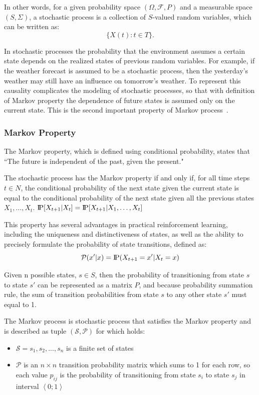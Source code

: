\documentclass[../xlapes02]{subfiles}
\begin{document}
    In other words, for a given probability space $(\Omega, \mathcal{F}, P)$ and a measurable space $(S, \Sigma)$, a stochastic process is a collection of $S$-valued random variables, which can be written as:~\cite{enwiki:1148510872}
    \[
        \{X(t) : t \in T\}.
    \]

    In stochastic processes the probability that the environment assumes a certain state depends on the realized states of previous random variables. For example, if the weather forecast is assumed to be a stochastic process, then the yesterday’s weather may still have an influence on tomorrow’s weather. To represent this causality complicates the modeling of stochastic processes, so that with definition of Markov property the dependence of future states is assumed only on the current state. This is the second important property of Markov process~\cite{FITMT25127}.

    \subsubsection{Markov Property}\label{subsubsec:markov-property}
    The Markov property, which is defined using conditional probability, states that ``The future is independent of the past, given the present."

    The stochastic process has the Markov property if and only if, for all time steps $t \in N$, the conditional probability of the next state given the current state is equal to the conditional probability of the next state given all the previous states $X_1, \ldots, X_t$. $\text{I\kern-0.15em P}[X_{t+1}|X_t] = \text{I\kern-0.15em P}[X_{t+1}|X_1,\ldots,X_t]$

    This property has several advantages in practical reinforcement learning, including the uniqueness and distinctiveness of states, as well as the ability to precisely formulate the probability of state transitions, defined as:~\cite{FITMT25127}
    \begin{equation}
        \mathcal{P}(x'|x)=\text{I\kern-0.15em P}(X_{t+1}=x'|X_t=x)
    \end{equation}

    Given n possible states, $s\in S$, then the probability of transitioning from state $s$ to state $s'$ can be represented as a matrix $P$, and because probability summation rule, the sum of transition probabilities from state $s$ to any other state $s'$ must equal to 1.

    The Markov process is stochastic process that satisfies the Markov property and is described as tuple $\left(\mathcal{S}, \mathcal{P}\right)$ for which holds:\cite{ABATE2021102207}
    \begin{itemize}
        \item $\mathcal{S} = s_1, s_2, ..., s_n$ is a finite set of states
        \item $\mathcal{P}$ is an $n\times n$ transition probability matrix which sums to 1 for each row, so each value $p_{ij}$ is the probability of transitioning from state $s_i$ to state $s_j$ in interval $\left< 0;1 \right>$
    \end{itemize}
\end{document}
